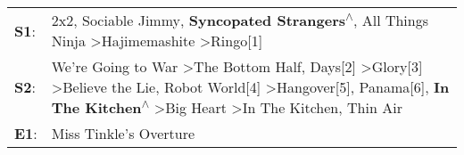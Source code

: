 \begin{supertabular}{p{0.03\textwidth}p{0.92\textwidth}}
 \textbf{S1}:  &                                                                                                                                                                                                                                                                                                       2x2\textsuperscript{}, \enspace Sociable Jimmy\textsuperscript{}, \enspace \textbf{Syncopated Strangers\textsuperscript{$\wedge$}}, \enspace All Things Ninja\textsuperscript{} \textgreater \enspace Hajimemashite\textsuperscript{} \textgreater \enspace Ringo[1]\textsuperscript{}  \enspace  \\
 \textbf{S2}:  &  We're Going to War\textsuperscript{} \textgreater \enspace The Bottom Half\textsuperscript{},  Days[2]\textsuperscript{} \textgreater \enspace Glory[3]\textsuperscript{} \textgreater \enspace Believe the Lie\textsuperscript{}, \enspace Robot World[4]\textsuperscript{} \textgreater \enspace Hangover[5]\textsuperscript{}, \enspace Panama[6]\textsuperscript{}, \enspace \textbf{In The Kitchen\textsuperscript{$\wedge$}} \textgreater \enspace Big Heart\textsuperscript{} \textgreater \enspace In The Kitchen\textsuperscript{}, \enspace Thin Air\textsuperscript{}  \enspace  \\
 \textbf{E1}:  &                                                                                                                                                                                                                                                                                                                                                                                                                                                                                                                                                     Miss Tinkle's Overture\textsuperscript{}  \enspace  \\
\end{supertabular}
